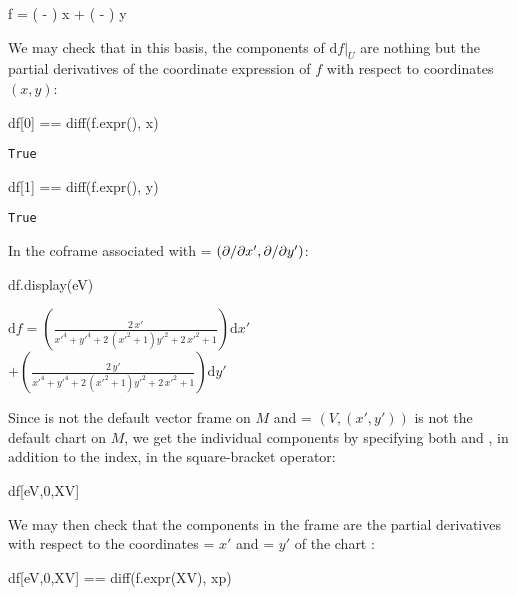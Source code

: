 \begin{NBoutM}
f = \left( - \right)  x + \left( - \right)  y
\end{NBoutM}
We may check that in this basis, the components of $\left. \mathrm{d}f \right| _U$
are nothing but the partial derivatives of the coordinate expression of $f$
with respect to coordinates $(x,y)$:
\begin{NBin}
df[0] == diff(f.expr(), x)
\end{NBin}
\begin{NBout}
\texttt{True}
\end{NBout}
\vspace*{-\baselineskip}
\begin{NBin}
df[1] == diff(f.expr(), y)
\end{NBin}
\begin{NBout}
\texttt{True}
\end{NBout}
In the coframe associated with  = $({\partial }/{\partial x'},{\partial }/{\partial y'})$:
\begin{NBin}
df.display(eV)
\end{NBin}
\begin{NBout}
$\displaystyle
\mathrm{d}f = \left( \frac{2 \, {x'}}{{x'}^{4} + {y'}^{4} + 2 \, {\left({x'}^{2} + 1\right)} {y'}^{2} + 2 \, {x'}^{2} + 1} \right) \mathrm{d} {x'} $\\
$\displaystyle
+ \left( \frac{2 \, {y'}}{{x'}^{4} + {y'}^{4} + 2 \, {\left({x'}^{2} + 1\right)} {y'}^{2} + 2 \, {x'}^{2} + 1} \right) \mathrm{d} {y'}$
\end{NBout}
Since  is not the default vector frame on $M$ and  = $(V,(x',y'))$
is not the default chart on $M$, we get the individual components by
specifying both  and , in addition to the index, in the
square-bracket operator:
\begin{NBin}
df[eV,0,XV]
\end{NBin}
\begin{NBoutM}
\end{NBoutM}
We may then check that the components in the frame 
are the partial derivatives with respect to the coordinates  = $x'$ and
 = $y'$ of the chart :
\begin{NBin}
df[eV,0,XV] == diff(f.expr(XV), xp)
\end{NBin}
